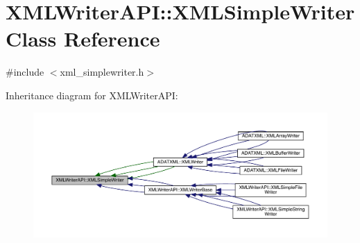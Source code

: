 \hypertarget{classXMLWriterAPI_1_1XMLSimpleWriter}{}\section{X\+M\+L\+Writer\+A\+PI\+:\+:X\+M\+L\+Simple\+Writer Class Reference}
\label{classXMLWriterAPI_1_1XMLSimpleWriter}


{\ttfamily \#include $<$xml\+\_\+simplewriter.\+h$>$}



Inheritance diagram for X\+M\+L\+Writer\+A\+PI\+:
\nopagebreak
\begin{figure}[H]
\begin{center}
\leavevmode
\includegraphics[width=350pt]{d8/de4/classXMLWriterAPI_1_1XMLSimpleWriter__inherit__graph}
\end{center}
\end{figure}
